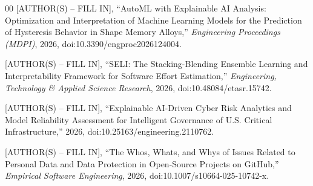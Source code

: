 \documentclass[conference]{IEEEtran}
\begin{document}
\begin{thebibliography}{00}
 [AUTHOR(S) -- FILL IN], ``AutoML with Explainable AI Analysis: Optimization and Interpretation of Machine Learning Models for the Prediction of Hysteresis Behavior in Shape Memory Alloys,'' \emph{Engineering Proceedings (MDPI)}, 2026, doi:10.3390/engproc2026124004.

 [AUTHOR(S) -- FILL IN], ``SELI: The Stacking-Blending Ensemble Learning and Interpretability Framework for Software Effort Estimation,'' \emph{Engineering, Technology \& Applied Science Research}, 2026, doi:10.48084/etasr.15742.

 [AUTHOR(S) -- FILL IN], ``Explainable AI-Driven Cyber Risk Analytics and Model Reliability Assessment for Intelligent Governance of U.S. Critical Infrastructure,'' 2026, doi:10.25163/engineering.2110762.

 [AUTHOR(S) -- FILL IN], ``The Whos, Whats, and Whys of Issues Related to Personal Data and Data Protection in Open-Source Projects on GitHub,'' \emph{Empirical Software Engineering}, 2026, doi:10.1007/s10664-025-10742-x.

\end{thebibliography}
\end{document}
